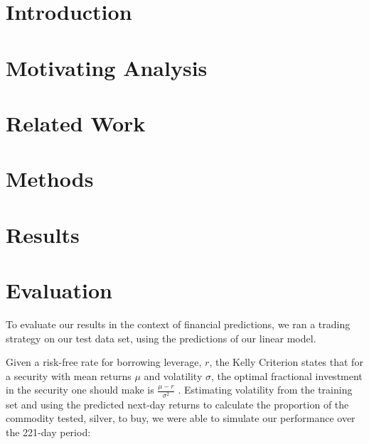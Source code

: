 \documentclass{article}
\begin{document}
\section{Introduction}


 
\section{Motivating Analysis}



\section{Related Work}



\section{Methods}



\section{Results}



\section{Evaluation}

To evaluate our results in the context of financial predictions, we ran a trading strategy on our test data set, using the predictions of our linear model.

Given a risk-free rate for borrowing leverage, $r$, the Kelly Criterion states that for a security with mean returns $\mu$ and volatility $\sigma$, the optimal fractional investment in the security one should make is $\frac{\mu-r}{\sigma^2}$ \cite{davis2012fractional}.  Estimating volatility from the training set and using the predicted next-day returns to calculate the proportion of the commodity tested, silver, to buy, we were able to simulate our performance over the 221-day period:
\end{document}
